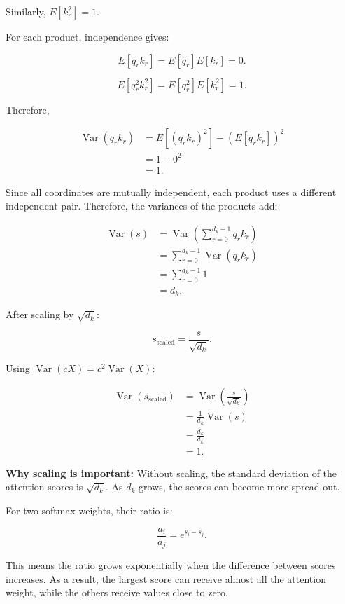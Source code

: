 \documentclass[11pt]{article}
\begin{document}
Similarly, $E[k_r^2]=1$.

For each product, independence gives:

\[
E[q_rk_r]=E[q_r]E[k_r]=0.
\]

\[
E[q_r^2k_r^2]
=E[q_r^2]E[k_r^2]=1.
\]

Therefore,

\[
\begin{aligned}
\operatorname{Var}(q_rk_r)
&=E[(q_rk_r)^2]-(E[q_rk_r])^2\\
&=1-0^2\\
&=1.
\end{aligned}
\]

Since all coordinates are mutually independent,
each product uses a different independent pair.
Therefore, the variances of the products add:

\[
\begin{aligned}
\operatorname{Var}(s)
&=\operatorname{Var}
\left(\sum_{r=0}^{d_k-1}q_rk_r\right)\\
&=\sum_{r=0}^{d_k-1}\operatorname{Var}(q_rk_r)\\
&=\sum_{r=0}^{d_k-1}1\\
&=\boxed{d_k}.
\end{aligned}
\]

After scaling by $\sqrt{d_k}$:

\[
s_{\mathrm{scaled}}=\frac{s}{\sqrt{d_k}}.
\]

Using $\operatorname{Var}(cX)=c^2\operatorname{Var}(X)$:

\[
\begin{aligned}
\operatorname{Var}(s_{\mathrm{scaled}})
&=\operatorname{Var}\left(\frac{s}{\sqrt{d_k}}\right)\\
&=\frac{1}{d_k}\operatorname{Var}(s)\\
&=\frac{d_k}{d_k}\\
&=\boxed{1}.
\end{aligned}
\]

\textbf{Why scaling is important:} Without scaling, the standard deviation of the
attention scores is $\sqrt{d_k}$. As $d_k$ grows,
the scores can become more spread out.

For two softmax weights, their ratio is:

\[
\frac{a_i}{a_j}=e^{s_i-s_j}.
\]

This means the ratio grows exponentially when
the difference between scores increases.
As a result, the largest score can receive almost
all the attention weight, while the others receive
values close to zero.
\end{document}
